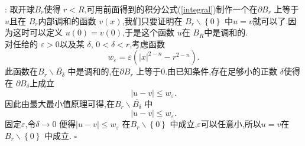 \documentclass[a4paper]{article}
\newenvironment{pro}{{\noindent\bfseries 证明}:}{\hfill $\square$\par}
\begin{document}
\begin{pro}
  取开球$B_r$使得 $r<R$,可用前面得到的积分公式(\ref{integral})制作一个在$\partial B_r$ 上等于$u$且在 $B_r$内部调和的函数 $v(x)$,我们只要证明在 $B_r\backslash\left\{ 0 \right\} $ 中$u=v$就可以了.因为这时可以定义 $u(0)=v(0)$,于是这个函数 $u$在 $B_R$中是调和的.\\
  对任给的 $\varepsilon>0$以及某 $\delta$, $0<\delta<r$,考虑函数
   \[
     w_{\varepsilon}=\varepsilon \left( \left| x \right| ^{2-n}-r^{2-n} \right) 
  .\] 
  此函数在$B_r\backslash \overline{B_{\delta}}$ 中是调和的,在$\partial B_r$ 上等于$0$.由已知条件,存在足够小的正数 $\delta$使得在 $\partial B_\delta$上成立
   \[
  \left| u-v \right| \le w_{\varepsilon }
  .\] 
  因此由最大最小值原理可得,在$B_{r}\backslash \overline{B_\delta}$ 中
  \[
  \left| u-v \right| \le w_{\varepsilon }
  .\] 
  固定$\varepsilon $,令$\delta\to 0$ 便得$\left| u-v \right| \le w_{\varepsilon}$ 在$B_r\backslash \left\{ 0 \right\}  $ 中成立,$\varepsilon $可以任意小,所以$u=v$在 $B_r\backslash \left\{ 0 \right\} $ 中成立.
\end{pro}
\end{document}
